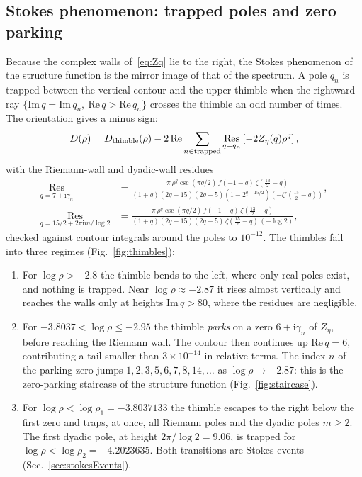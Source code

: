 \documentclass[aip,pof,preprint,floatfix,nofootinbib,amsmath,amssymb]{revtex4-2}
\def\I{\mathrm{i}}
\newcommand{\Res}{\operatorname*{Res}}
\begin{document}
\subsection{Stokes phenomenon: trapped poles and zero parking}

Because the complex walls of~\eqref{eq:Zq} lie to the right, the Stokes phenomenon of the structure function is the mirror
image of that of the spectrum. A pole $q_n$ is trapped between the vertical contour and the upper thimble when the rightward
ray $\{\mathrm{Im}\,q=\mathrm{Im}\,q_n,\ \mathrm{Re}\,q>\mathrm{Re}\,q_n\}$ crosses the thimble an odd number of times. The
orientation gives a minus sign:
\begin{equation}
    D(\rho)=D_{\rm thimble}(\rho)-2\,\mathrm{Re}\sum_{n\in\text{trapped}}\Res_{q=q_n}\left[-2Z_\eta(q)\rho^{q}\right],
    \label{eq:Stokes}
\end{equation}
with the Riemann-wall and dyadic-wall residues
\begin{align}
    \Res_{q=7+\I\gamma_n}&=\frac{\pi\,\rho^{q}\csc(\pi q/2)\,f(-1-q)\,\zeta\!\left(\frac{13}{2}-q\right)}
    {(1+q)(2q-15)(2q-5)\left(1-2^{q-15/2}\right)\left(-\zeta'\!\left(\frac{15}{2}-q\right)\right)},\\
    \Res_{q=15/2+2\pi\I m/\log2}&=\frac{\pi\,\rho^{q}\csc(\pi q/2)\,f(-1-q)\,\zeta\!\left(\frac{13}{2}-q\right)}
    {(1+q)(2q-15)(2q-5)\,\zeta\!\left(\frac{15}{2}-q\right)\,(-\log 2)} ,
\end{align}
checked against contour integrals around the poles to $10^{-12}$. The thimbles fall into three regimes (Fig.~\ref{fig:thimbles}):
\begin{enumerate}
\item For $\log\rho>-2.8$ the thimble bends to the left, where only real poles exist, and nothing is trapped. Near
$\log\rho\approx-2.87$ it rises almost vertically and reaches the walls only at heights $\mathrm{Im}\,q>80$, where the
residues are negligible.
\item For $-3.8037<\log\rho\le-2.95$ the thimble \emph{parks} on a zero $6+\I\gamma_n$ of $Z_\eta$, before reaching the Riemann
wall. The contour then continues up $\mathrm{Re}\,q=6$, contributing a tail smaller than $3\times10^{-14}$ in relative terms. The
index $n$ of the parking zero jumps $1,2,3,5,6,7,8,14,\ldots$ as $\log\rho\to-2.87$: this is the zero-parking staircase of the
structure function (Fig.~\ref{fig:staircase}).
\item For $\log\rho<\log\rho_1=-3.8037133$ the thimble escapes to the right below the first zero and traps, at once, all
Riemann poles and the dyadic poles $m\ge2$. The first dyadic pole, at height $2\pi/\log2=9.06$, is trapped for
$\log\rho<\log\rho_2=-4.2023635$. Both transitions are Stokes events (Sec.~\ref{sec:stokesEvents}).
\end{enumerate}
\end{document}
